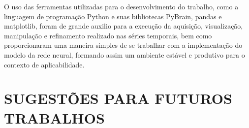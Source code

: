 O uso das ferramentas utilizadas para o desenvolvimento do trabalho, como a linguagem de programação Python e suas bibliotecas PyBrain, pandas e matplotlib, foram de grande auxilio para a execução da aquisição, visualização, manipulação e refinamento realizado nas séries temporais, bem como proporcionaram uma maneira simples de se trabalhar com a implementação do modelo da rede neural, formando assim um ambiente estável e produtivo para o contexto de aplicabilidade.

\section{SUGESTÕES PARA FUTUROS TRABALHOS}